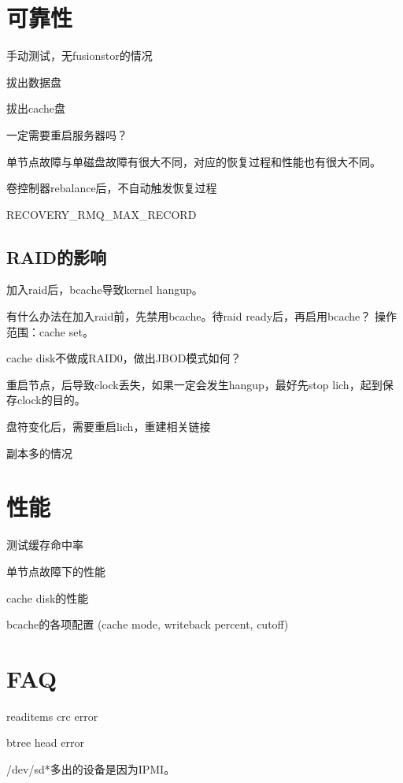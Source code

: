 \section{可靠性}

手动测试，无fusionstor的情况
\begin{enumbox}
\item 拔出数据盘
\item 拔出cache盘
\end{enumbox}

一定需要重启服务器吗？

单节点故障与单磁盘故障有很大不同，对应的恢复过程和性能也有很大不同。

卷控制器rebalance后，不自动触发恢复过程

RECOVERY\_RMQ\_MAX\_RECORD

\subsection{RAID的影响}


加入raid后，bcache导致kernel hangup。

有什么办法在加入raid前，先禁用bcache。待raid ready后，再启用bcache？
操作范围：cache set。

cache disk不做成RAID0，做出JBOD模式如何？

重启节点，后导致clock丢失，如果一定会发生hangup，最好先stop lich，起到保存clock的目的。

盘符变化后，需要重启lich，重建相关链接

副本多的情况

\section{性能}

测试缓存命中率

单节点故障下的性能
\begin{enumbox}
\item cache disk的性能
\item bcache的各项配置 (cache mode, writeback percent, cutoff)
\end{enumbox}

\section{FAQ}

readitems crc error

btree head error

/dev/sd*多出的设备是因为IPMI。
